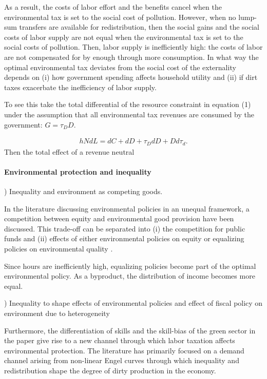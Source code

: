 As a result, the costs of labor effort and the benefits cancel when the environmental tax is set to the social cost of pollution. However, when no lump-sum transfers are available for redistribution, then the social gains and the social costs of labor supply are not equal when the environmental tax is set to the social costs of pollution. Then, labor supply is inefficiently high: the costs of labor are not compensated for by enough through more consumption. In what way the optimal environmental tax deviates from the social cost of the externality depends on (i) how government spending affects household utility and (ii) if dirt taxes exacerbate the inefficiency of labor supply. 

To see this take the total differential of the resource constraint in \cite{LansBovenberg1994EnvironmentalTaxation} equation (1) under the assumption that all environmental tax revenues are consumed by the government: $G=\tau_D D$.

\begin{align}
hNdL = dC+dD+\tau_D dD +D d\tau_d.
\end{align}
 Then the total effect of a revenue neutral 


\paragraph{Environmental protection and inequality}
) Inequality and environment as competing goods.

In the literature discussing environmental policies in an unequal framework, a competition between equity and environmental good provision have been discussed. 
This trade-off can be separated into (i) the competition for public funds \citep{LansBovenberg1996OptimalAnalyses, Jacobs2019RedistributionCurves} and (ii) effects of either environmental policies on equity or equalizing policies on environmental quality \citep{Jacobs2019RedistributionCurves, Sager2019IncomeCurves, Dobkowitz2022}. 

Since hours are inefficiently high, equalizing policies become part of the optimal environmental policy. As a byproduct, the distribution of income becomes more equal.


) Inequality to shape effects of environmental policies and effect of fiscal policy on environment due to heterogeneity

 Furthermore, the differentiation of skills and the skill-bias of the green sector in the paper give rise to a new channel through which labor taxation affects environmental protection. The literature has primarily focused on a demand channel arising from non-linear Engel curves through which inequality and redistribution shape the degree of dirty production in the economy.   

